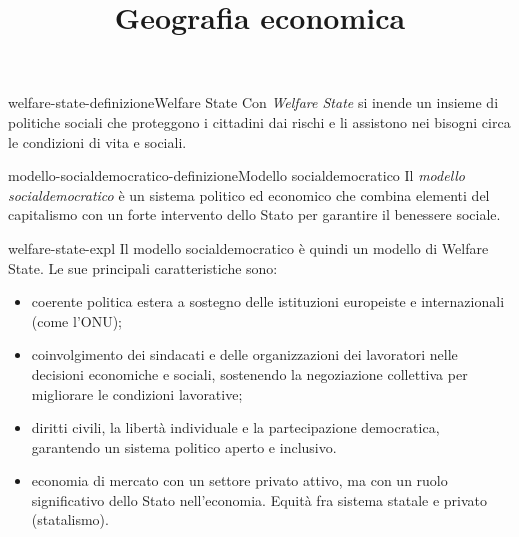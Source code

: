 \documentclass[preview]{standalone}
\begin{document}
\title{Geografia economica}
\genpage

\begin{snippetdefinition}{welfare-state-definizione}{Welfare State}
    Con \textit{Welfare State} si inende un insieme di politiche sociali
    che proteggono i cittadini dai rischi e li assistono nei bisogni circa le condizioni di vita e sociali.
\end{snippetdefinition}

\begin{snippetdefinition}{modello-socialdemocratico-definizione}{Modello socialdemocratico}
    Il \textit{modello socialdemocratico} è un sistema politico ed economico che combina elementi del capitalismo con un forte intervento dello Stato per garantire il benessere sociale.
\end{snippetdefinition}

\begin{snippet}{welfare-state-expl}
    Il modello socialdemocratico è quindi un modello di Welfare State.
    Le sue principali caratteristiche sono:
    \begin{itemize}
        \item coerente politica estera a sostegno delle istituzioni europeiste e internazionali (come l'ONU);
        \item coinvolgimento dei sindacati e delle organizzazioni dei lavoratori nelle decisioni economiche e sociali, sostenendo la negoziazione collettiva per migliorare le condizioni lavorative;
        \item diritti civili, la libertà individuale e la partecipazione democratica, garantendo un sistema politico aperto e inclusivo.
        \item economia di mercato con un settore privato attivo, ma con un ruolo significativo dello Stato nell'economia.
            Equità fra sistema statale e privato (statalismo).
    \end{itemize}
\end{snippet}
\end{document}
